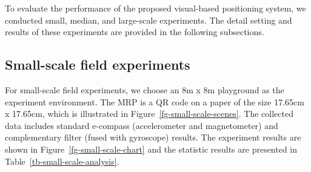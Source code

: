 To evaluate the performance of the proposed visual-based positioning system, we conducted small, median, and large-scale experiments. The detail setting and results of these experiments are provided in the following subsections.
\subsection{Small-scale field experiments}
For small-scale field experiments, we choose an 8m x 8m playground as the experiment environment. The MRP is a QR code on a paper of the size 17.65cm x 17.65cm, which is illustrated in Figure~\ref{fg-small-scale-scenes}. The collected data includes standard e-compass (accelerometer and magnetometer) and complementary filter (fused with gyroscope) results. The experiment results are shown in Figure~\ref{fg-small-scale-chart} and the statistic results are presented in Table~\ref{tb-small-scale-analysis}.\\

